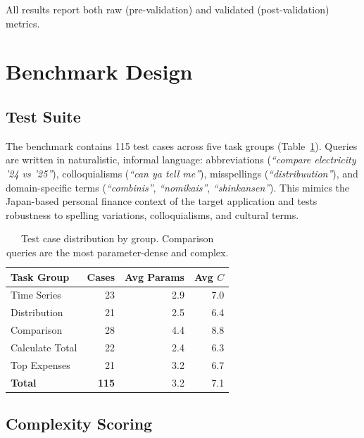 \documentclass[11pt,twocolumn]{article}
\begin{document}
All results report both raw (pre-validation) and validated
(post-validation) metrics.

\section{Benchmark Design}
\label{sec:benchmark}

\subsection{Test Suite}

The benchmark contains 115 test cases across five task groups
(Table~\ref{tab:tc_distribution}).
Queries are written in naturalistic, informal language: abbreviations
(\emph{``compare electricity '24 vs '25''}), colloquialisms
(\emph{``can ya tell me''}), misspellings (\emph{``distribuution''}),
and domain-specific terms (\emph{``combinis''}, \emph{``nomikais''},
\emph{``shinkansen''}).
This mimics the Japan-based personal finance context of the target
application and tests robustness to spelling variations,
colloquialisms, and cultural terms.

\begin{table}[t]
\centering
\small
\begin{tabular}{@{}lrrr@{}}
\toprule
\textbf{Task Group} & \textbf{Cases} & \textbf{Avg Params} & \textbf{Avg $C$} \\
\midrule
Time Series     & 23 & 2.9 & 7.0 \\
Distribution    & 21 & 2.5 & 6.4 \\
Comparison      & 28 & 4.4 & 8.8 \\
Calculate Total & 22 & 2.4 & 6.3 \\
Top Expenses    & 21 & 3.2 & 6.7 \\
\midrule
\textbf{Total}  & \textbf{115} & 3.2 & 7.1 \\
\bottomrule
\end{tabular}
\caption{Test case distribution by group. Comparison queries are the
most parameter-dense and complex.}
\label{tab:tc_distribution}
\end{table}

\subsection{Complexity Scoring}
\end{document}
